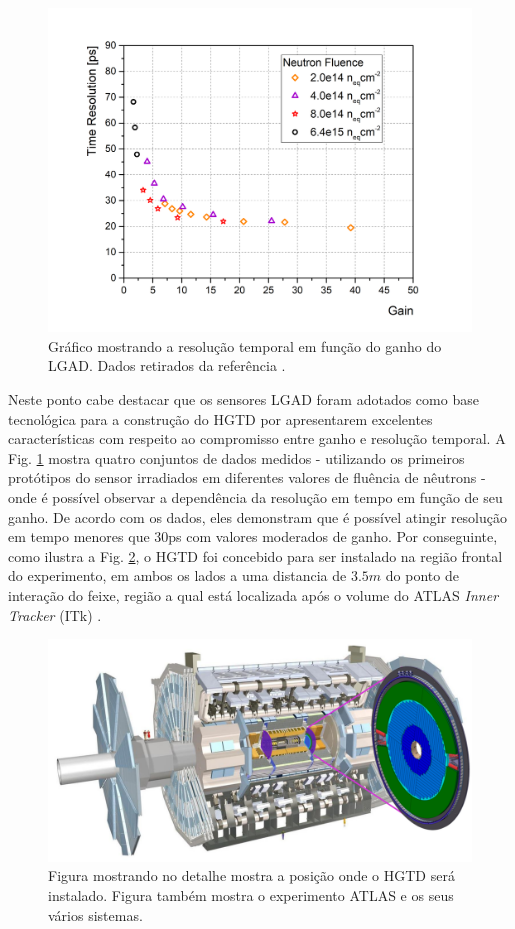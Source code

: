 \begin{figure} 
    \centering
    \includegraphics[width=12.0cm]{assets/timeresolution_vs_gain.png}
    \caption{ Gráfico mostrando a resolução temporal em função do ganho do LGAD. Dados retirados da referência \cite{tdr}.}
    \label{timeresolution}
\end{figure}

Neste ponto cabe destacar que os sensores LGAD foram adotados como base tecnológica para a construção do HGTD por apresentarem excelentes características com respeito ao compromisso entre ganho e resolução temporal. A Fig. \ref{timeresolution} mostra quatro conjuntos de dados medidos - utilizando os primeiros protótipos do sensor irradiados em  diferentes valores de fluência de nêutrons - onde é possível observar a dependência da resolução em tempo em função de seu ganho. De acordo com os dados, eles demonstram que é possível atingir resolução em tempo menores que 30ps com valores moderados de ganho.    
Por conseguinte, como ilustra a Fig. \ref{hgtd}, o HGTD foi concebido para ser instalado na região frontal do experimento, em ambos os lados a uma distancia de $3.5m$ do ponto de interação do feixe, região a qual está localizada após o volume do ATLAS {\it Inner Tracker} (ITk) \cite{tdr}. 

\begin{figure} 
    \centering
    \includegraphics[width=15.0cm]{assets/ATLAS_HGTD.png}
    \caption{ Figura mostrando no detalhe mostra a posição onde o HGTD será instalado. Figura também mostra o experimento ATLAS e os seus vários sistemas.}
    \label{hgtd}
\end{figure}

